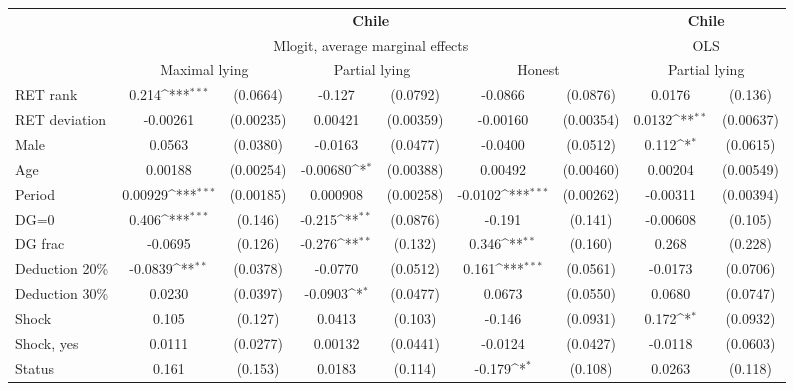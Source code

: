 \def\sym#1{\ifmmode^{#1}\else\(^{#1}\)\fi}
\begin{tabular}{l|cccccc|cc}
\hline\hline
&\multicolumn{6}{c|}{\bf Chile}&\multicolumn{2}{c}{\bf Chile}\\ &\multicolumn{6}{c|}{Mlogit, average marginal effects }&\multicolumn{2}{c}{OLS}\\
                &\multicolumn{2}{c}{Maximal lying}&\multicolumn{2}{c}{Partial lying}&\multicolumn{2}{c|}{Honest}  &\multicolumn{2}{c}{Partial lying}\\
\hline
RET rank        &    0.214\sym{***}& (0.0664)&   -0.127         & (0.0792)&  -0.0866         & (0.0876)&   0.0176         &  (0.136)\\
RET deviation   & -0.00261         &(0.00235)&  0.00421         &(0.00359)& -0.00160         &(0.00354)&   0.0132\sym{**} &(0.00637)\\
Male            &   0.0563         & (0.0380)&  -0.0163         & (0.0477)&  -0.0400         & (0.0512)&    0.112\sym{*}  & (0.0615)\\
Age             &  0.00188         &(0.00254)& -0.00680\sym{*}  &(0.00388)&  0.00492         &(0.00460)&  0.00204         &(0.00549)\\
Period          &  0.00929\sym{***}&(0.00185)& 0.000908         &(0.00258)&  -0.0102\sym{***}&(0.00262)& -0.00311         &(0.00394)\\
DG=0          &    0.406\sym{***}&  (0.146)&   -0.215\sym{**} & (0.0876)&   -0.191         &  (0.141)& -0.00608         &  (0.105)\\
DG frac         &  -0.0695         &  (0.126)&   -0.276\sym{**} &  (0.132)&    0.346\sym{**} &  (0.160)&    0.268         &  (0.228)\\
Deduction 20\%&  -0.0839\sym{**} & (0.0378)&  -0.0770         & (0.0512)&    0.161\sym{***}& (0.0561)&  -0.0173         & (0.0706)\\
Deduction 30\%&   0.0230         & (0.0397)&  -0.0903\sym{*}  & (0.0477)&   0.0673         & (0.0550)&   0.0680         & (0.0747)\\
Shock         &    0.105         &  (0.127)&   0.0413         &  (0.103)&   -0.146         & (0.0931)&    0.172\sym{*}  & (0.0932)\\
Shock, yes    &   0.0111         & (0.0277)&  0.00132         & (0.0441)&  -0.0124         & (0.0427)&  -0.0118         & (0.0603)\\
Status        &    0.161         &  (0.153)&   0.0183         &  (0.114)&   -0.179\sym{*}  &  (0.108)&   0.0263         &  (0.118)\\

\end{tabular}
